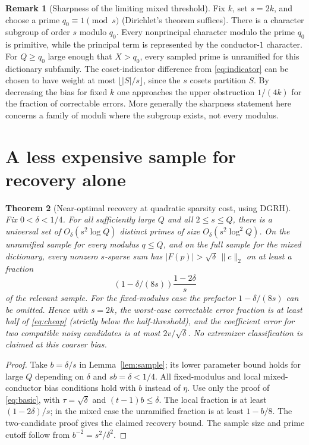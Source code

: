 \documentclass[11pt]{article}
\newtheorem{theorem}{Theorem}[section]
\theoremstyle{definition}\newtheorem{remark}[theorem]{Remark}
\newcommand{\norm}[1]{\lVert #1\rVert}
\newcommand{\GRH}{\textup{DGRH}}
\begin{document}
\begin{remark}[Sharpness of the limiting mixed threshold]
Fix $k$, set $s=2k$, and choose a prime $q_0\equiv1\pmod s$ (Dirichlet's theorem suffices). There is a character subgroup of order $s$ modulo $q_0$. Every nonprincipal character modulo the prime $q_0$ is primitive, while the principal term is represented by the conductor-$1$ character. For $Q\ge q_0$ large enough that $X>q_0$, every sampled prime is unramified for this dictionary subfamily. The coset-indicator difference from \eqref{eq:indicator} can be chosen to have weight at most $\lfloor |S|/s\rfloor$, since the $s$ cosets partition $S$. By decreasing the bias for fixed $k$ one approaches the upper obstruction $1/(4k)$ for the fraction of correctable errors. More generally the sharpness statement here concerns a family of moduli where the subgroup exists, not every modulus.
\end{remark}

\section{A less expensive sample for recovery alone}
\begin{theorem}[Near-optimal recovery at quadratic sparsity cost, using \GRH]\label{thm:cheap}
Fix $0<\delta<1/4$. For all sufficiently large $Q$ and all $2\le s\le Q$, there is a universal set of $O_\delta(s^2\log Q)$ distinct primes of size $O_\delta(s^2\log^2 Q)$. On the unramified sample for every modulus $q\le Q$, and on the full sample for the mixed dictionary, every nonzero $s$-sparse sum has $|F(p)|>\sqrt\delta\,\norm c_2$ on at least a fraction
\begin{equation}\label{eq:cheap}
 (1-\delta/(8s))\frac{1-2\delta}{s}
\end{equation}
of the relevant sample. For the fixed-modulus case the prefactor $1-\delta/(8s)$ can be omitted. Hence with $s=2k$, the worst-case correctable error fraction is at least half of \eqref{eq:cheap} (strictly below the half-threshold), and the coefficient error for two compatible noisy candidates is at most $2v/\sqrt\delta$. No extremizer classification is claimed at this coarser bias.
\end{theorem}
\begin{proof}
Take $b=\delta/s$ in Lemma~\ref{lem:sample}; its lower parameter bound holds for large $Q$ depending on $\delta$ and $sb=\delta<1/4$. All fixed-modulus and local mixed-conductor bias conditions hold with $b$ instead of $\eta$. Use only the proof of \eqref{eq:basic}, with $\tau=\sqrt\delta$ and $(t-1)b\le\delta$. The local fraction is at least $(1-2\delta)/s$; in the mixed case the unramified fraction is at least $1-b/8$. The two-candidate proof gives the claimed recovery bound. The sample size and prime cutoff follow from $b^{-2}=s^2/\delta^2$.
\end{proof}
\end{document}
